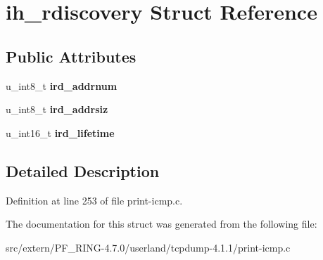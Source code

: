 \hypertarget{structih__rdiscovery}{
\section{ih\_\-rdiscovery Struct Reference}
\label{structih__rdiscovery}
}
\subsection*{Public Attributes}
\begin{DoxyCompactItemize}
\item 
\hypertarget{structih__rdiscovery_aeaa624f83dcdbdf624e4ddfd5a8ba3d0}{
u\_\-int8\_\-t {\bfseries ird\_\-addrnum}}
\label{structih__rdiscovery_aeaa624f83dcdbdf624e4ddfd5a8ba3d0}

\item 
\hypertarget{structih__rdiscovery_a6355a4307779021dd3f3ff7156f5e071}{
u\_\-int8\_\-t {\bfseries ird\_\-addrsiz}}
\label{structih__rdiscovery_a6355a4307779021dd3f3ff7156f5e071}

\item 
\hypertarget{structih__rdiscovery_ad70f53f1161b31d0968ed47cc23105b3}{
u\_\-int16\_\-t {\bfseries ird\_\-lifetime}}
\label{structih__rdiscovery_ad70f53f1161b31d0968ed47cc23105b3}

\end{DoxyCompactItemize}


\subsection{Detailed Description}


Definition at line 253 of file print-\/icmp.c.



The documentation for this struct was generated from the following file:\begin{DoxyCompactItemize}
\item 
src/extern/PF\_\-RING-\/4.7.0/userland/tcpdump-\/4.1.1/print-\/icmp.c\end{DoxyCompactItemize}
